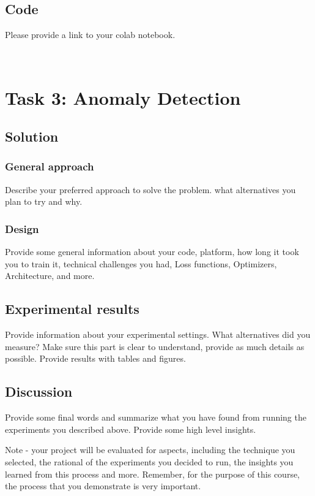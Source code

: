\documentclass{article}
\begin{document}
\subsection{Code}

Please provide a link to your colab notebook.


\
\section{Task 3: Anomaly Detection}

\subsection{Solution}
\subsubsection{General approach}
Describe your preferred approach to solve the problem. what alternatives you plan to try and why. 

\subsubsection{Design}
Provide some general information about your code, platform, how long it took you to train it, technical challenges you had, Loss functions, Optimizers, Architecture, and more.

\subsection{Experimental results}
Provide information about your experimental settings. What alternatives did you measure? Make sure this part is clear to understand, provide as much details as possible. Provide results with tables and figures.

\subsection{Discussion}
Provide some final words and summarize what you have found from running the experiments you described above. Provide some high level insights.

Note - your project will be evaluated for aspects, including the technique you selected, the rational of the experiments you decided to run, the insights you learned from this process and more. Remember, for the purpose of this course, the process that you demonstrate is very  important.
\end{document}
